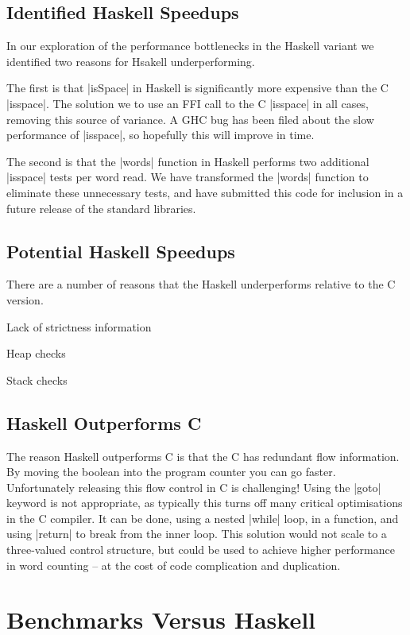 \documentclass{llncs}
\begin{document}
\subsection{Identified Haskell Speedups}

In our exploration of the performance bottlenecks in the Haskell variant we identified two reasons for Hsakell underperforming.

The first is that |isSpace| in Haskell is significantly more expensive than the C |isspace|. The solution we to use an FFI call to the C |isspace| in all cases, removing this source of variance. A GHC bug has been filed about the slow performance of |isspace|, so hopefully this will improve in time.

The second is that the |words| function in Haskell performs two additional |isspace| tests per word read. We have transformed the |words| function to eliminate these unnecessary tests, and have submitted this code for inclusion in a future release of the standard libraries.

\subsection{Potential Haskell Speedups}

There are a number of reasons that the Haskell underperforms relative to the C version.

Lack of strictness information

Heap checks

Stack checks

\subsection{Haskell Outperforms C}

The reason Haskell outperforms C is that the C has redundant flow information. By moving the boolean into the program counter you can go faster. Unfortunately releasing this flow control in C is challenging! Using the |goto| keyword is not appropriate, as typically this turns off many critical optimisations in the C compiler. It can be done, using a nested |while| loop, in a function, and using |return| to break from the inner loop. This solution would not scale to a three-valued control structure, but could be used to achieve higher performance in word counting -- at the cost of code complication and duplication.

\section{Benchmarks Versus Haskell}
\end{document}
